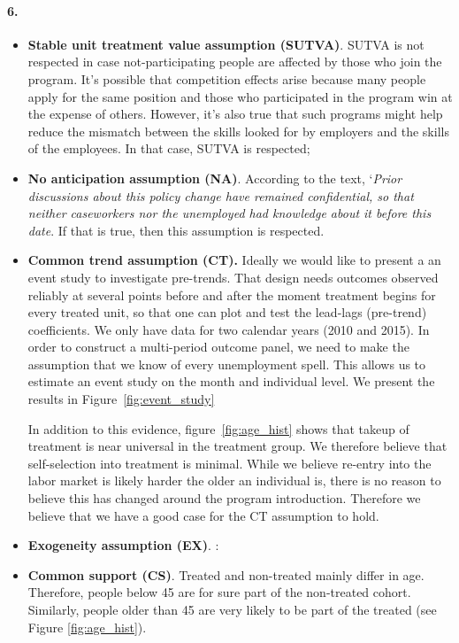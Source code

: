 \documentclass{scrartcl}
\begin{document}
\paragraph*{6.}

\begin{itemize}[label=$\blacktriangleright$]
    \item \textbf{Stable unit treatment value assumption (SUTVA)}. SUTVA is not respected in case not-participating people are affected by those who join the program. It's possible that competition effects arise because many people apply for the same position and those who participated in the program win at the expense of others. However, it's also true that such programs might help reduce the mismatch between the skills looked for by employers and the skills of the employees. In that case, SUTVA is respected;\

    \item \textbf{No anticipation assumption (NA)}. According to the text, `\textit{Prior discussions about this policy change have remained confidential, so that neither caseworkers nor the unemployed had knowledge about it before this date}. If that is true, then this assumption is respected. \

    \item \textbf{Common trend assumption (CT).} Ideally we would like to present a an event study to investigate pre-trends. That design needs outcomes observed reliably at several points before and after the moment treatment begins for every treated unit, so that one can plot and test the lead-lags (pre-trend) coefficients. We only have data for two calendar years (2010 and 2015). In order to construct a multi-period outcome panel, we need to make the assumption that we know of every unemployment spell. This allows us to estimate an event study on the month and individual level. We present the results in Figure~\ref{fig:event_study}
    
    In addition to this evidence, figure~\ref{fig:age_hist} shows that takeup of treatment is near universal in the treatment group. We therefore believe that self-selection into treatment is minimal. While we believe re-entry into the labor market is likely harder the older an individual is, there is no reason to believe this has changed around the program introduction. Therefore we believe that we have a good case for the CT assumption to hold.\ 

    \item \textbf{Exogeneity assumption (EX)}. :\ 

    \item \textbf{Common support (CS)}. Treated and non-treated mainly differ in age. Therefore, people below 45 are for sure part of the non-treated cohort. Similarly, people older than 45 are very likely to be part of the treated (see Figure \ref{fig:age_hist}).
\end{itemize}
\end{document}
